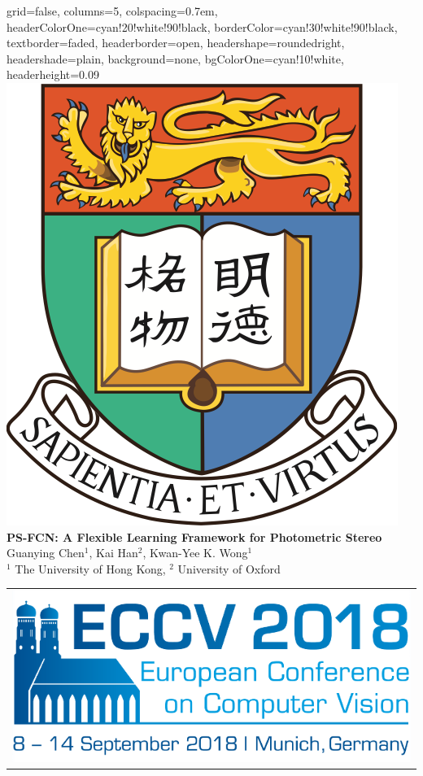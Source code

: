\documentclass[portrait,a0paper,fontscale=0.292]{baposter}
\begin{document}
\begin{poster}{
 grid=false,
 columns=5,
 colspacing=0.7em,
 headerColorOne=cyan!20!white!90!black,
 borderColor=cyan!30!white!90!black,
 textborder=faded,
 headerborder=open,
 headershape=roundedright,
 headershade=plain,
 background=none,
 bgColorOne=cyan!10!white,
 headerheight=0.09\textheight}
 {
      \includegraphics[width=0.08\linewidth]{HKU_logo}
      \makebox[0.01\textwidth]{} 
      \makebox[0.04\textwidth]{} 
 }
 {\sc\huge\bf PS-FCN: A Flexible Learning Framework for Photometric Stereo}
 {\vspace{0.3em} Guanying Chen$^1$, Kai Han$^2$, Kwan-Yee K. Wong$^1$ \\[0.2em]
 {$^1$ The University of Hong Kong, $^2$ University of Oxford\\[0.2em] }}
 {
    \begin{tabular}{r}
        \includegraphics[width=0.15\linewidth]{cropped-Logo_ECCV18_RGB_1200x280}
    \end{tabular}
 }



\end{poster}
\end{document}
